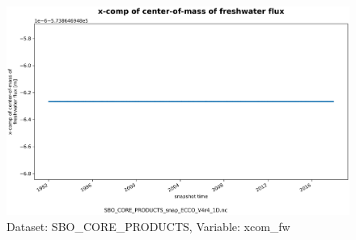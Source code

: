 \begin{figure}[H]
\centering
\includegraphics[scale=0.55]{../images/plots/oneD_plots/SBO_Core_Products/xcom_fw.png}
\caption{Dataset: SBO\_CORE\_PRODUCTS, Variable: xcom\_fw}
\label{tab:table-SBO_CORE_PRODUCTS_xcom_fw-Plot}
\end{figure}
\pagebreak
